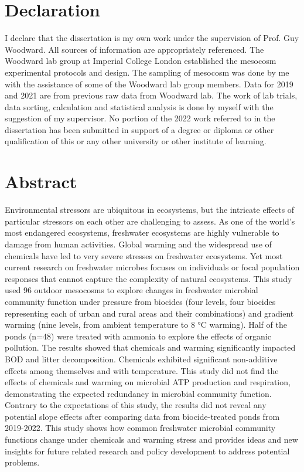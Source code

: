 \documentclass[11pt, a4paper]{article}
\begin{document}
\begin{spacing}{1.5}



\section*{Declaration}

I declare that the dissertation is my own work under the supervision of Prof. Guy Woodward. All sources of information are appropriately referenced. The Woodward lab group at Imperial College London established the mesocosm experimental protocols and design. The sampling of mesocosm was done by me with the assistance of some of the Woodward lab group members. Data for 2019 and 2021 are from previous raw data from Woodward lab. The work of lab trials, data sorting, calculation and statistical analysis is done by myself with the suggestion of my supervisor. No portion of the 2022 work referred to in the dissertation has been submitted in support of a degree or diploma or other qualification of this or any other university or other institute of learning. 

\clearpage

\section*{Abstract}

Environmental stressors are ubiquitous in ecosystems, but the intricate effects of particular stressors on each other are challenging to assess. As one of the world's most endangered ecosystems, freshwater ecosystems are highly vulnerable to damage from human activities. Global warming and the widespread use of chemicals have led to very severe stresses on freshwater ecosystems. Yet most current research on freshwater microbes focuses on individuals or focal population responses that cannot capture the complexity of natural ecosystems. This study used 96 outdoor mesocosms to explore changes in freshwater microbial community function under pressure from biocides (four levels, four biocides representing each of urban and rural areas and their combinations) and gradient warming (nine levels, from ambient temperature to 8 °C warming). Half of the ponds (n=48) were treated with ammonia to explore the effects of organic pollution. The results showed that chemicals and warming significantly impacted BOD and litter decomposition. Chemicals exhibited significant non-additive effects among themselves and with temperature. This study did not find the effects of chemicals and warming on microbial ATP production and respiration, demonstrating the expected redundancy in microbial community function. Contrary to the expectations of this study, the results did not reveal any potential slope effects after comparing data from biocide-treated ponds from 2019-2022. This study shows how common freshwater microbial community functions change under chemicals and warming stress and provides ideas and new insights for future related research and policy development to address potential problems. 


\end{spacing}
\end{document}
